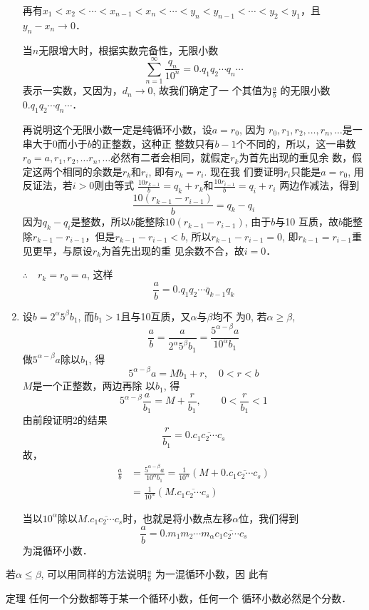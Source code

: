 \begin{enumerate}
再有$x_1<x_2<\cdots<x_{n-1}<x_n<\cdots<y_n<y_{n-1}<\cdots<y_2<y_1$，且$y_n-x_n\to 0$．

当$n$无限增大时，根据实数完备性，无限小数
\[\sum_{n=1}^{\infty}\frac{q_n}{10^n}=0.q_1q_2\cdots q_n\cdots\]
表示一实数，又因为，$d_n\to 0$, 故我们确定了一
个其值为$\frac{a}{b}$
的无限小数$0.q_1q_2\cdots q_n\cdots$．

再说明这个无限小数一定是纯循环小数，设$a=r_0$, 因为
$r_0,r_1,r_2,\ldots,r_n,\ldots$是一串大于0而小于$b$的正整数，这种正
整数只有$b-1$个不同的，所以，这一串数$r_0=a,r_1,r_2,\ldots r_n,\ldots$必然有二者会相同，就假定$r_k$为首先出现的重见余
数，假定这两个相同的余数是$r_k$和$r_i$, 即有$r_k=r_i$. 现在我
们要证明$r_i$只能是$a=r_0$, 用反证法，若$i>0$则由等式
$\frac{10r_{k-1}}{b}=q_k+r_k$和$\frac{10r_{i-1}}{b}=q_i+r_i$ 两边作减法，得到
\[\frac{10(r_{k-1}-r_{i-1})}{b}=q_k-q_i\]
因为$q_k-q_i$是整数，所以$b$能整除$10(r_{k-1}-r_{i-1})$, 由于$b$与10
互质，故$b$能整除$r_{k-1}-r_{i-1}$，但是$r_{k-1}-r_{i-1}<b$, 所以$r_{k-1}-r_{i-1}=0$, 即$r_{k-1}=r_{i-1}$重见更早，与原设$r_k$为首先出现的重
见余数不合，故$i=0$．

$\therefore\quad r_k=r_0=a$, 这样
\[\frac{a}{b}=0.\overline{q_1q_2\cdots q_{k-1}q_k}\]

\item 设$b=2^{\alpha}5^{\beta}b_1$, 而$b_1>1$且与10互质，又$\alpha$与$\beta$均不
为0, 若$\alpha\ge \beta$,
\[\frac{a}{b}=\frac{a}{2^{\alpha}5^{\beta}b_1}=\frac{5^{\alpha-\beta}a}{10^{\alpha}b_1}\]
做$5^{\alpha-\beta}a$除以$b_1$, 得
\[5^{\alpha-\beta}a=M{b_1}+{r},\quad 0<r<b\]
$M$是一个正整数，两边再除
以$b_1$, 得
\[5^{\alpha-\beta}\frac{a}{b_1}=M+\frac{r}{b_1},\qquad 0<\frac{r}{b_1}<1\]
由前段证明2的结果
\[\frac{r}{b_1}=0.\overline{c_1c_2\cdots c_{s}}\]
故，
\[\begin{split}
    \frac{a}{b}&=\frac{5^{\alpha-\beta}a}{10^{\alpha}b_1}=\frac{1}{10^{\alpha}}\left(M+0.\overline{c_1c_2\cdots c_{s}}\right)\\
    &=\frac{1}{10^{\alpha}}\left(M.\overline{c_1c_2\cdots c_{s}}\right)
\end{split}\]

当以$10^{\alpha}$除以$M.\overline{c_1c_2\cdots c_{s}}$时，也就是将小数点左移$\alpha$位，我们得到
\[\frac{a}{b}=0.m_1m_2\cdots m_{\alpha}\overline{c_1c_2\cdots c_{s}}\]
为混循环小数．
\end{enumerate}

若$\alpha\le \beta$, 可以用同样的方法说明$\frac{a}{b}$
为一混循环小数，因
此有
\begin{blk}{定理}
    任何一个分数都等于某一个循环小数，任何一个
循环小数必然是个分数．
\end{blk}

